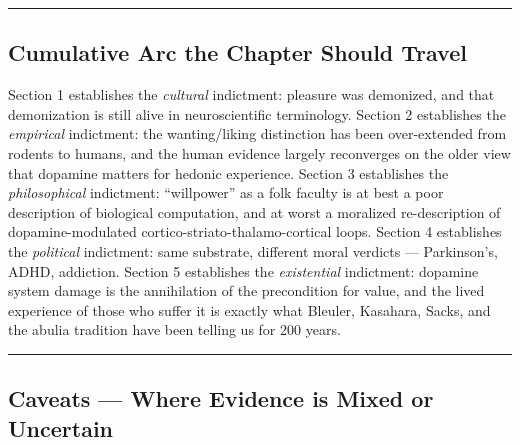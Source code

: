 \begin{center}\rule{0.5\linewidth}{0.5pt}\end{center}

\subsection{Cumulative Arc the Chapter Should Travel}\label{07_pleasure_and_self-cumulative-arc-the-chapter-should-travel}

Section 1 establishes the \emph{cultural} indictment: pleasure was demonized, and that demonization is still alive in neuroscientific terminology. Section 2 establishes the \emph{empirical} indictment: the wanting/liking distinction has been over-extended from rodents to humans, and the human evidence largely reconverges on the older view that dopamine matters for hedonic experience. Section 3 establishes the \emph{philosophical} indictment: ``willpower'' as a folk faculty is at best a poor description of biological computation, and at worst a moralized re-description of dopamine-modulated cortico-striato-thalamo-cortical loops. Section 4 establishes the \emph{political} indictment: same substrate, different moral verdicts --- Parkinson's, ADHD, addiction. Section 5 establishes the \emph{existential} indictment: dopamine system damage is the annihilation of the precondition for value, and the lived experience of those who suffer it is exactly what Bleuler, Kasahara, Sacks, and the abulia tradition have been telling us for 200 years.

\begin{center}\rule{0.5\linewidth}{0.5pt}\end{center}

\subsection{Caveats --- Where Evidence is Mixed or Uncertain}\label{07_pleasure_and_self-caveats-where-evidence-is-mixed-or-uncertain}


